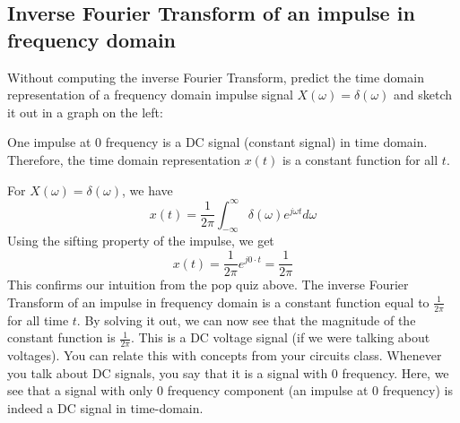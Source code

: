 \documentclass{ee102_notes}
\begin{document}
\subsection{Inverse Fourier Transform of an impulse in frequency domain}
\begin{popquiz}
Without computing the inverse Fourier Transform, predict the time domain representation of a frequency domain impulse signal $X(\omega) = \delta(\omega)$ and sketch it out in a graph on the left:
  \begin{center}
  \end{center}
  \popqsplit 
  One impulse at 0 frequency is a DC signal (constant signal) in time domain. Therefore, the time domain representation $x(t)$ is a constant function for all $t$.
\end{popquiz}

For $X(\omega) = \delta(\omega)$, we have
\begin{equation*}
    x(t) = \frac{1}{2\pi} \int_{-\infty}^{\infty} \delta(\omega) e^{j\omega t} d\omega
\end{equation*}
Using the sifting property of the impulse, we get
\begin{equation*}
    x(t) = \frac{1}{2\pi} e^{j0 \cdot t} = \frac{1}{2\pi}
\end{equation*}
This confirms our intuition from the pop quiz above. The inverse Fourier Transform of an impulse in frequency domain is a constant function equal to $\frac{1}{2\pi}$ for all time $t$. By solving it out, we can now see that the magnitude of the constant function is $\frac{1}{2\pi}$. This is a DC voltage signal (if we were talking about voltages). You can relate this with concepts from your circuits class. Whenever you talk about DC signals, you say that it is a signal with 0 frequency. Here, we see that a signal with only 0 frequency component (an impulse at 0 frequency) is indeed a DC signal in time-domain.
\end{document}
